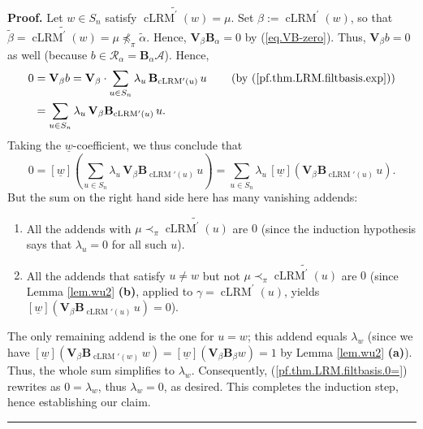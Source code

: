\documentclass[submission]{FPSAC2026}
\newcommand{\cLRM}{\operatorname{cLRM}}
\newenvironment{proof}[1][Proof]{\noindent\textbf{#1.} }{\ \rule{0.5em}{0.5em}}
\begin{document}
\begin{proof}
Let $w\in S_{n}$ satisfy $\widetilde{\operatorname{cLRM}^{\prime}(w)}=\mu$.
Set $\beta:=\operatorname{cLRM}^{\prime}(w)$, so that $\widetilde{\beta
}=\widetilde{\operatorname{cLRM}^{\prime}(w)}=\mu\npreceq_{\pi}%
\widetilde{\alpha}$. Hence, $\mathbf{V}%
_{\beta}\mathbf{B}_{\alpha}=0$ by (\ref{eq.VB-zero}).
Thus, $\mathbf{V}_{\beta}b=0$ as well
(because $b\in\mathcal{R}_{\alpha}=\mathbf{B}_{\alpha}\mathcal{A}$). Hence,%
\begin{align*}
0  & =\mathbf{V}_{\beta}b=\mathbf{V}_{\beta}\cdot\sum_{u\in S_{n}}\lambda
_{u}\,\mathbf{B}_{\cLRM'(u)}\,u\qquad\left(
\text{by (\ref{pf.thm.LRM.filtbasis.exp})}\right)  \\
& =\sum_{u\in S_{n}}\lambda_{u}\,\mathbf{V}_{\beta}\mathbf{B}%
_{\cLRM'(u)}\,u.
\end{align*}
Taking the $\underline w$-coefficient, we thus conclude that%
\begin{equation}
0=\left[  \underline w\right]  \left(  \sum_{u\in S_{n}}\lambda_{u}\,\mathbf{V}_{\beta
}\mathbf{B}_{\cLRM'(u)}\,u\right)  =\sum_{u\in
S_{n}}\lambda_{u}\,\left[  \underline w\right]  \left(  \mathbf{V}_{\beta}\mathbf{B}%
_{\cLRM'(u)}\,u\right)
.\label{pf.thm.LRM.filtbasis.0=}%
\end{equation}
But the sum on the right hand side here has many vanishing addends:
\begin{enumerate}
\item All the addends with $\mu\prec_{\pi}\widetilde{\operatorname{cLRM}%
^{\prime}(u)}$ are $0$ (since the induction hypothesis says that $\lambda
_{u}=0$ for all such $u$).
\item All the addends that satisfy $u\neq w$ but not $\mu\prec_{\pi
}\widetilde{\operatorname{cLRM}^{\prime}(u)}$ are $0$ (since Lemma
\ref{lem.wu2} \textbf{(b)}, applied to $\gamma=\operatorname*{cLRM}%
\nolimits^{\prime}\left(  u\right)  $,
yields $\left[  \underline w\right]  \left(
\mathbf{V}_{\beta}\mathbf{B}_{\cLRM'%
(u)}\,u\right)  =0$).
\end{enumerate}
The only remaining addend is the one for $u=w$; this addend equals
$\lambda_{w}$ (since we have $\left[  \underline w\right]  \left(  \mathbf{V}_{\beta}%
\mathbf{B}_{\cLRM'(w)}\,w\right)  =\left[
\underline w\right]  \left(  \mathbf{V}_{\beta}\mathbf{B}_{\beta}w\right)  =1$ by Lemma
\ref{lem.wu2} \textbf{(a)}). Thus, the whole sum simplifies to $\lambda_w$.
Consequently, (\ref{pf.thm.LRM.filtbasis.0=}) rewrites as $0=\lambda_{w}$,
thus $\lambda_{w}=0$, as desired. This completes the induction step, hence
establishing our claim.
\end{proof}
\end{document}
